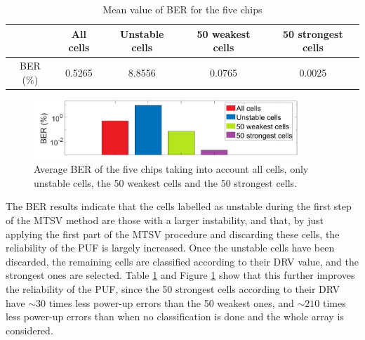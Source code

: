\begin{table}[H]
  \centering
  \caption{Mean value of BER for the five chips}
  \vspace{5mm}
    \begin{tabular}{|c|c|c|c|c|}
    \hline
     & All cells & Unstable cells & 50 weakest cells & 50 strongest cells \bigstrut\\
          \hline
    BER (\%) & 0.5265  & 8.8556  & 0.0765  & 0.0025  \bigstrut\\
    \hline
    \end{tabular}%
  \label{tab:Nom_ave_BER}%
\end{table}%


\begin{figure}[H]
    \centering
    \includegraphics[width=10cm]{images/histBERSnW.jpg}
    \caption{Average BER of the five chips taking into account all cells, only unstable cells, the 50 weakest cells and the 50 strongest cells. }
    \label{fig:BERhistSnW}
\end{figure}
The BER results indicate that the cells labelled as unstable during the first step of the MTSV method are those with a larger instability, and that, by just applying the first part of the MTSV procedure and discarding these cells, the reliability of the PUF is largely increased. Once the unstable cells have been discarded, the remaining cells are classified  according to their DRV value, and the strongest ones are selected. Table \ref{tab:Nom_ave_BER} and Figure \ref{fig:BERhistSnW} show that this further improves the reliability of the PUF, since the 50 strongest cells according to their DRV have $\sim30$ times less power-up errors than the 50 weakest ones, and $\sim210$ times less power-up errors than when no classification is done and the whole array is considered.

